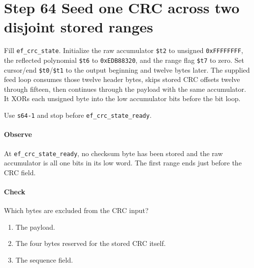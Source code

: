 \section{Step 64 Seed one CRC across two disjoint stored ranges}
Fill \texttt{ef\_crc\_state}. Initialize the raw accumulator \texttt{\$t2} to unsigned \texttt{0xFFFFFFFF}, the reflected polynomial \texttt{\$t6} to \texttt{0xEDB88320}, and the range flag \texttt{\$t7} to zero. Set cursor/end \texttt{\$t0}/\texttt{\$t1} to the output beginning and twelve bytes later. The supplied feed loop consumes those twelve header bytes, skips stored CRC offsets twelve through fifteen, then continues through the payload with the same accumulator. It XORs each unsigned byte into the low accumulator bits before the bit loop.

Use \texttt{s64-1} and stop before \texttt{ef\_crc\_state\_ready}.

\paragraph{Observe} At \texttt{ef\_crc\_state\_ready}, no checksum byte has been stored and the raw accumulator is all one bits in its low word. The first range ends just before the CRC field.

\paragraph{Check} Which bytes are excluded from the CRC input?
\begin{enumerate}[label=\Alph*.]
  \item The payload.
  \item The four bytes reserved for the stored CRC itself.
  \item The sequence field.
\end{enumerate}
